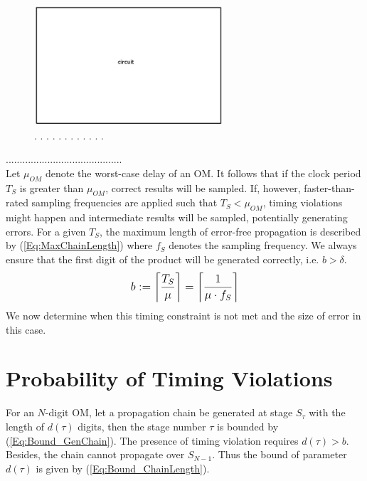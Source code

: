 \documentclass[journal]{IEEEtran}
\begin{document}
\begin{figure}[h!]
\begin{center}
\includegraphics[width=7cm,height=4.5cm]{./Figures/circuit}
\caption{  . . . . . . . . . . . . }\label{circuit}
\end{center}
\end{figure}




..........................................\\

Let $\mu_{OM}$ denote the worst-case delay of an OM. It follows that if the clock period $T_S$ is greater than $\mu_{OM}$, correct results will be sampled. If, however, faster-than-rated sampling frequencies are applied such that $T_S<\mu_{OM}$, timing violations might happen and intermediate results will be sampled, potentially generating errors. For a given $T_S$, the maximum length of error-free propagation is described by (\ref{Eq:MaxChainLength}) where $f_S$ denotes the sampling frequency. We always ensure that the first digit of the product will be generated correctly, i.e. $b>\delta$.
%
\begin{eqnarray}\label{Eq:MaxChainLength}
\footnotesize
  b:=\left\lceil \frac{T_S}{\mu} \right\rceil=\left\lceil \frac{1}{\mu\cdot f_S}\right\rceil
\normalsize
\end{eqnarray}
%
We now determine when this timing constraint is not met and the size of error in this case.\\




\section{Probability of Timing Violations}\label{section:Prob}

For an $N$-digit OM, let a propagation chain be generated at stage $S_{\tau}$ with the length of $d(\tau)$ digits, then the stage number $\tau$ is bounded by (\ref{Eq:Bound_GenChain}). The presence of timing violation requires $d(\tau)>b$. Besides, the chain cannot propagate over $S_{N-1}$. Thus the bound of parameter $d(\tau)$ is given by (\ref{Eq:Bound_ChainLength}).
\end{document}

